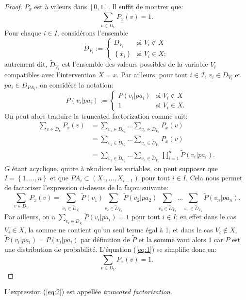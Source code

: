 \begin{proof}
$P_x$ est à valeurs dans $[0,1]$. Il suffit de montrer que:
\[ \sum_{v\in D_V}^{}P_x(v)=1. \]
Pour chaque $i\in I$, considérons l'ensemble
\[ \tilde{D}_{V_i}:=
  \begin{cases}
    D_{V_i}&\text{si $V_i\not \in X$}\\
    \left\{ x_i \right\}&\text{si $V_i\in X$};
  \end{cases}
\]
autrement dit, $\tilde{D}_{V_i}$ est l'ensemble des valeurs possibles de la
variable $V_i$ compatibles avec l'intervention $X=x$. Par ailleurs, pour tout $i\in \mathcal{I}$, $v_i\in D_{V_i}$ et $pa_i\in D_{PA_i}$, on considère la notation:
\[ \tilde{P}(v_i|pa_i):=
\begin{cases}
  P(v_i|pa_i)&\text{si $V_i\not \in X$}\\
  1&\text{si $V_i\in X$}.
\end{cases} \]
On peut alors traduire la truncated factorization comme suit:
\begin{align*}
\sum_{v\in D_V}^{}P_x(v)&=\sum_{v_1\in D_{V_1}}^{}\dots \sum_{v_n\in D_{V_n}}^{}P_x(v)\\
&=\sum_{v_1\in \tilde{D}_{V_1}}^{}\dots \sum_{v_n\in
                    \tilde{D}_{V_n}}^{}P_x(v)\\
&=\sum_{v_1\in \tilde{D}_{V_1}}^{}\dots \sum_{v_n\in \tilde{D}_{V_n}}^{}\prod_{i=1}^n\tilde{P}(v_i|pa_i).
\end{align*}
$G$ étant acyclique, quitte à réindicer les variables, on peut
supposer que $I=\left\{ 1,\dots,n \right\}$ et que $PA_i\subset
(X_1,\dots,X_{i-1})$ pour tout $i\in I$. Cela nous permet de
factoriser l'expression ci-dessus de la façon suivante:
\begin{equation}
\label{eq:1}
\sum_{v\in D_V}^{}P_x(v)=\sum_{v_1\in \tilde{D}_{V_1}}^{}\tilde{P}(v_1)\sum_{v_2\in \tilde{D}_{V_2}}^{}\tilde{P}(v_2|pa_2)\sum_{v_3\in \tilde{D}_{V_3}}^{}\dots \sum_{v_n\in \tilde{D}_{V_n}}^{}\tilde{P}(v_n|pa_n).
\end{equation}
Par ailleurs, on a $\sum_{v_i\in D_{V_i}}^{}\tilde{P}(v_i|pa_i)=1$ pour tout $i\in I$; en effet dans le cas $V_i\in X$, la somme ne contient qu'un seul terme égal à 1, et dans le cas $V_i\not \in X$, $\tilde{P}(v_i|pa_i)=P(v_i|pa_i)$ par définition de $\tilde{P}$ et la somme vaut alors $1$ car $P$ est une distribution de probabilité.
L'équation (\ref{eq:1}) se simplifie donc en:
\[ \sum_{v\in D_V}^{}P_x(v)=1. \]
\end{proof}

L'expression (\ref{eq:2}) est appellée \emph{truncated factorization}.

